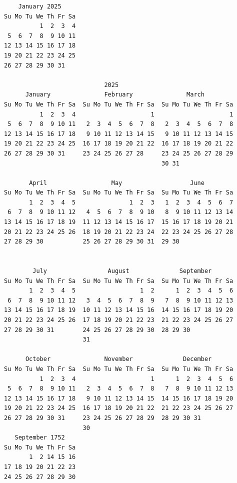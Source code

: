 \documentclass[
]{article}
\begin{document}
\begin{verbatim}
    January 2025      
Su Mo Tu We Th Fr Sa  
          1  2  3  4  
 5  6  7  8  9 10 11  
12 13 14 15 16 17 18  
19 20 21 22 23 24 25  
26 27 28 29 30 31     
                      
                            2025
      January               February               March          
Su Mo Tu We Th Fr Sa  Su Mo Tu We Th Fr Sa  Su Mo Tu We Th Fr Sa  
          1  2  3  4                     1                     1  
 5  6  7  8  9 10 11   2  3  4  5  6  7  8   2  3  4  5  6  7  8  
12 13 14 15 16 17 18   9 10 11 12 13 14 15   9 10 11 12 13 14 15  
19 20 21 22 23 24 25  16 17 18 19 20 21 22  16 17 18 19 20 21 22  
26 27 28 29 30 31     23 24 25 26 27 28     23 24 25 26 27 28 29  
                                            30 31                 

       April                  May                   June          
Su Mo Tu We Th Fr Sa  Su Mo Tu We Th Fr Sa  Su Mo Tu We Th Fr Sa  
       1  2  3  4  5               1  2  3   1  2  3  4  5  6  7  
 6  7  8  9 10 11 12   4  5  6  7  8  9 10   8  9 10 11 12 13 14  
13 14 15 16 17 18 19  11 12 13 14 15 16 17  15 16 17 18 19 20 21  
20 21 22 23 24 25 26  18 19 20 21 22 23 24  22 23 24 25 26 27 28  
27 28 29 30           25 26 27 28 29 30 31  29 30                 
                                                                  

        July                 August              September        
Su Mo Tu We Th Fr Sa  Su Mo Tu We Th Fr Sa  Su Mo Tu We Th Fr Sa  
       1  2  3  4  5                  1  2      1  2  3  4  5  6  
 6  7  8  9 10 11 12   3  4  5  6  7  8  9   7  8  9 10 11 12 13  
13 14 15 16 17 18 19  10 11 12 13 14 15 16  14 15 16 17 18 19 20  
20 21 22 23 24 25 26  17 18 19 20 21 22 23  21 22 23 24 25 26 27  
27 28 29 30 31        24 25 26 27 28 29 30  28 29 30              
                      31                                          

      October               November              December        
Su Mo Tu We Th Fr Sa  Su Mo Tu We Th Fr Sa  Su Mo Tu We Th Fr Sa  
          1  2  3  4                     1      1  2  3  4  5  6  
 5  6  7  8  9 10 11   2  3  4  5  6  7  8   7  8  9 10 11 12 13  
12 13 14 15 16 17 18   9 10 11 12 13 14 15  14 15 16 17 18 19 20  
19 20 21 22 23 24 25  16 17 18 19 20 21 22  21 22 23 24 25 26 27  
26 27 28 29 30 31     23 24 25 26 27 28 29  28 29 30 31           
                      30                                          
   September 1752     
Su Mo Tu We Th Fr Sa  
       1  2 14 15 16  
17 18 19 20 21 22 23  
24 25 26 27 28 29 30  
                      
                      
                      
\end{verbatim}
\end{document}
